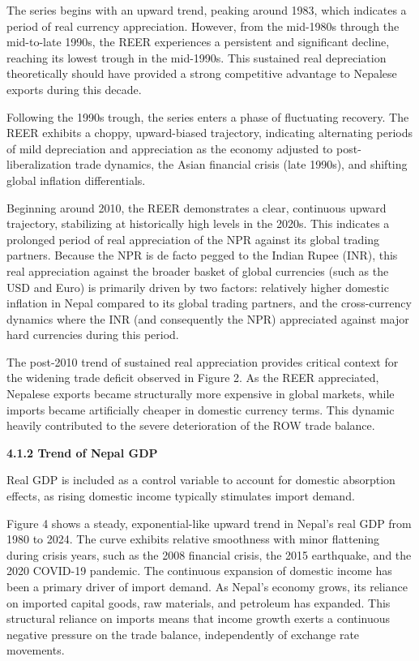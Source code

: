 \documentclass[12pt]{article}
\begin{document}
The series begins with an upward trend, peaking around 1983, which indicates a period of real currency appreciation. However, from the mid-1980s through the mid-to-late 1990s, the REER experiences a persistent and significant decline, reaching its lowest trough in the mid-1990s. This sustained real depreciation theoretically should have provided a strong competitive advantage to Nepalese exports during this decade.

Following the 1990s trough, the series enters a phase of fluctuating recovery. The REER exhibits a choppy, upward-biased trajectory, indicating alternating periods of mild depreciation and appreciation as the economy adjusted to post-liberalization trade dynamics, the Asian financial crisis (late 1990s), and shifting global inflation differentials.

Beginning around 2010, the REER demonstrates a clear, continuous upward trajectory, stabilizing at historically high levels in the 2020s. This indicates a prolonged period of real appreciation of the NPR against its global trading partners. Because the NPR is de facto pegged to the Indian Rupee (INR), this real appreciation against the broader basket of global currencies (such as the USD and Euro) is primarily driven by two factors: relatively higher domestic inflation in Nepal compared to its global trading partners, and the cross-currency dynamics where the INR (and consequently the NPR) appreciated against major hard currencies during this period.

The post-2010 trend of sustained real appreciation provides critical context for the widening trade deficit observed in Figure 2. As the REER appreciated, Nepalese exports became structurally more expensive in global markets, while imports became artificially cheaper in domestic currency terms. This dynamic heavily contributed to the severe deterioration of the ROW trade balance.

\vspace{0.5cm}
\noindent\textbf{4.1.2 Trend of Nepal GDP}

Real GDP is included as a control variable to account for domestic absorption effects, as rising domestic income typically stimulates import demand.

Figure 4 shows a steady, exponential-like upward trend in Nepal’s real GDP from 1980 to 2024. The curve exhibits relative smoothness with minor flattening during crisis years, such as the 2008 financial crisis, the 2015 earthquake, and the 2020 COVID-19 pandemic. The continuous expansion of domestic income has been a primary driver of import demand. As Nepal's economy grows, its reliance on imported capital goods, raw materials, and petroleum has expanded. This structural reliance on imports means that income growth exerts a continuous negative pressure on the trade balance, independently of exchange rate movements.
\end{document}
